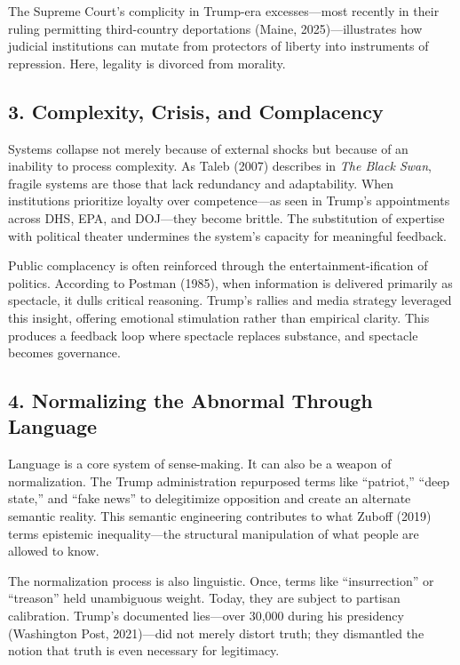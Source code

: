 \documentclass[
]{article}
\begin{document}
The Supreme Court's complicity in Trump-era excesses---most recently in their ruling permitting third-country deportations (Maine, 2025)---illustrates how judicial institutions can mutate from protectors of liberty into instruments of repression. Here, legality is divorced from morality.

\subsection{3. Complexity, Crisis, and Complacency}\label{complexity-crisis-and-complacency}

Systems collapse not merely because of external shocks but because of an inability to process complexity. As Taleb (2007) describes in \emph{The Black Swan}, fragile systems are those that lack redundancy and adaptability. When institutions prioritize loyalty over competence---as seen in Trump's appointments across DHS, EPA, and DOJ---they become brittle. The substitution of expertise with political theater undermines the system's capacity for meaningful feedback.

Public complacency is often reinforced through the entertainment-ification of politics. According to Postman (1985), when information is delivered primarily as spectacle, it dulls critical reasoning. Trump's rallies and media strategy leveraged this insight, offering emotional stimulation rather than empirical clarity. This produces a feedback loop where spectacle replaces substance, and spectacle becomes governance.

\subsection{4. Normalizing the Abnormal Through Language}\label{normalizing-the-abnormal-through-language}

Language is a core system of sense-making. It can also be a weapon of normalization. The Trump administration repurposed terms like ``patriot,'' ``deep state,'' and ``fake news'' to delegitimize opposition and create an alternate semantic reality. This semantic engineering contributes to what Zuboff (2019) terms epistemic inequality---the structural manipulation of what people are allowed to know.

The normalization process is also linguistic. Once, terms like ``insurrection'' or ``treason'' held unambiguous weight. Today, they are subject to partisan calibration. Trump's documented lies---over 30,000 during his presidency (Washington Post, 2021)---did not merely distort truth; they dismantled the notion that truth is even necessary for legitimacy.
\end{document}
